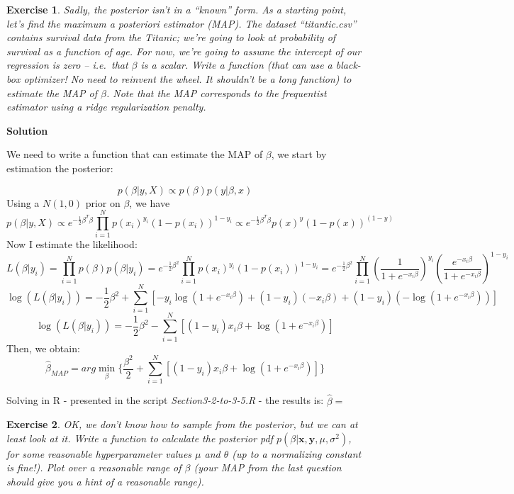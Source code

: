 \documentclass[twoside]{article}
\newcounter{lecnum}
\newtheorem{exercise}{Exercise}[lecnum]
\begin{document}
\begin{exercise}
  Sadly, the posterior isn't in a ``known'' form. As a starting point, let's find the maximum a posteriori estimator (MAP). The dataset ``titantic.csv'' contains survival data from the Titanic; we're going to look at probability of survival as a function of age. For now, we're going to assume the intercept of our regression is zero -- i.e.\ that $\beta$ is a scalar.  Write a function (that can use a black-box optimizer! No need to reinvent the wheel. It shouldn't be a long function) to estimate the MAP of $\beta$. Note that the MAP corresponds to the frequentist estimator using a ridge regularization penalty.
\end{exercise}

{\color{blue}
	\textbf{Solution}
	
	We need to write a function that can estimate the MAP of $\beta$, we start by estimation the posterior:
	
	$$ p(\beta| y, X) \propto p(\beta)p(y|\beta,x) $$
	Using a $N(1, 0)$ prior on $\beta$, we have
	$$
	p(\beta| y, X) \propto  e^{-\frac{1}{2}\beta ^T\beta}
	\prod_{i=1}^{N} p(x_i)^{y_i}(1-p(x_i))^{1-y_i} 
	\propto  e^{-\frac{1}{2}\beta ^T\beta} p(x)^y(1-p(x))^{(1-y)} $$
	Now I estimate the likelihood:
	$$
	L(\beta| y_i)  = \prod_{i=1}^{N} p(\beta)p(\beta| y_i)  =  
	e^{-\frac{1}{2}\beta^2}\prod_{i=1}^{N} p(x_i)^{y_i}(1-p(x_i))^{1-y_i} = 
	e^{-\frac{1}{2}\beta^2} \prod_{i=1}^{N} \left( \frac{1}{1+e^{-x_i\beta}} \right)^{y_i}
	\left( \frac{e^{-x_i\beta}}{1+e^{-x_i\beta}} \right)^{1-y_i}
	$$
	$$
	\log(L(\beta| y_i)) = -\frac{1}{2}\beta^2 + \sum^{N}_{i=1} \left[ - y_i \log(1+e^{-x_i\beta}) + (1-y_i) (- x_i\beta) + (1-y_i)(-\log(1+e^{-x_i\beta})) \right] 
	$$ $$
	\log(L(\beta| y_i)) = -\frac{1}{2}\beta^2 - \sum^{N}_{i=1} \left[  (1-y_i) x_i\beta + \log(1+e^{-x_i\beta}) \right] $$
	Then, we obtain: 	
	$$	\hat{\beta}_{MAP} = arg \min_{\beta} \bigg\{ 
	\frac{\beta^2}{2} + 
	 \sum^{N}_{i=1} \left[  (1-y_i) x_i\beta + \log(1+e^{-x_i\beta}) \right]  \bigg\} 
	$$
	
	Solving in R - presented in the script \textit{Section3-2-to-3-5.R} - the results is: $\hat{\beta} = $
	
	
	
	
} %
\begin{exercise}
  OK, we don't know how to sample from the posterior, but we can at least look at it. Write a function to calculate the posterior pdf $p(\beta|\mathbf{x},\mathbf{y},\mu,\sigma^2)$, for some reasonable hyperparameter values $\mu$ and $\theta$ (up to a normalizing constant is fine!). Plot over a reasonable range of $\beta$ (your MAP from the last question should give you a hint of a reasonable range).
\end{exercise}
\end{document}
